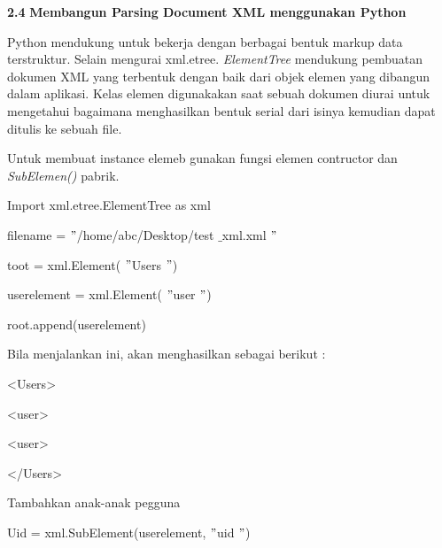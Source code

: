 \noindent 
\textbf{2.4}\textbf{ Membangun Parsing Document XML menggunakan Python} \par
\noindent 
 \hspace*{0.5in} Python mendukung untuk bekerja dengan berbagai bentuk markup data terstruktur. Selain mengurai xml.etree. \textit{ElementTree} mendukung pembuatan dokumen XML yang terbentuk dengan baik dari objek elemen yang dibangun dalam aplikasi. Kelas elemen digunakakan saat sebuah dokumen diurai untuk mengetahui bagaimana menghasilkan bentuk serial dari isinya kemudian dapat ditulis ke sebuah file.  \par
\vspace{12pt}
\noindent 
 \hspace*{0.5in} Untuk membuat instance elemeb gunakan fungsi elemen contructor dan \textit{SubElemen()} pabrik. \par
\noindent 
Import xml.etree.ElementTree as xml \par
\vspace{12pt}
\noindent 
{\fontsize{10pt}{10pt}\selectfont filename =  $ " $/home/abc/Desktop/test $  \_  $xml.xml $ " $} \par
\noindent 
{\fontsize{10pt}{10pt}\selectfont toot = xml.Element( $ " $Users $ " $)} \par
\noindent 
{\fontsize{10pt}{10pt}\selectfont userelement = xml.Element( $ " $user $ " $)} \par
\noindent 
{\fontsize{10pt}{10pt}\selectfont root.append(userelement)} \par
\noindent 
\vspace{10pt}
\noindent 
Bila menjalankan ini, akan menghasilkan sebagai berikut : \par
\noindent 
{\fontsize{10pt}{10pt}\selectfont <Users>} \par
\noindent 
{\fontsize{10pt}{10pt}\selectfont  \hspace*{0.5in} <user>} \par
\noindent 
{\fontsize{10pt}{10pt}\selectfont  \hspace*{0.5in} <user>} \par
\noindent 
{\fontsize{10pt}{10pt}\selectfont </Users>} \par
\vspace{10pt}
\vspace{10pt}
\vspace{10pt}
\noindent 
Tambahkan anak-anak pegguna \par
\vspace{10pt}
\noindent 
{\fontsize{10pt}{10pt}\selectfont Uid = xml.SubElement(userelement,  $ " $uid $ " $)} \par
